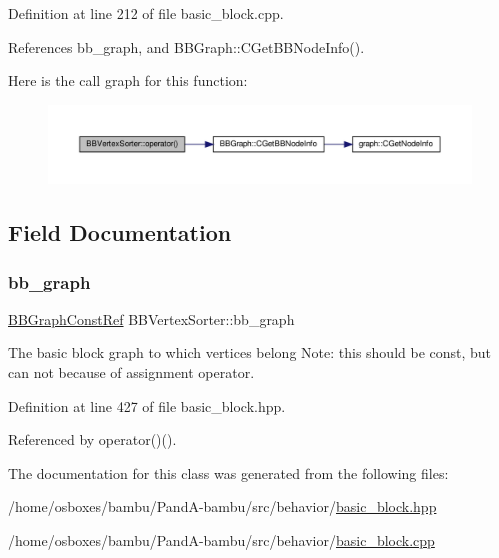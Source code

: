 Definition at line 212 of file basic\+\_\+block.\+cpp.



References bb\+\_\+graph, and B\+B\+Graph\+::\+C\+Get\+B\+B\+Node\+Info().

Here is the call graph for this function\+:
\nopagebreak
\begin{figure}[H]
\begin{center}
\leavevmode
\includegraphics[width=350pt]{d8/d74/classBBVertexSorter_a0943b78b2e713d833b00a78e20703588_cgraph}
\end{center}
\end{figure}


\subsection{Field Documentation}
\mbox{\label{classBBVertexSorter_a56dc2b2e2e26f2c91300b9c985533b23}} 
\subsubsection{\texorpdfstring{bb\+\_\+graph}{bb\_graph}}
{\footnotesize\ttfamily \hyperlink{basic__block_8hpp_ab66bdbde3a29e41d079d8a320af9c921}{B\+B\+Graph\+Const\+Ref} B\+B\+Vertex\+Sorter\+::bb\+\_\+graph\hspace{0.3cm}{\ttfamily [private]}}



The basic block graph to which vertices belong Note\+: this should be const, but can not because of assignment operator. 



Definition at line 427 of file basic\+\_\+block.\+hpp.



Referenced by operator()().



The documentation for this class was generated from the following files\+:\begin{DoxyCompactItemize}
\item 
/home/osboxes/bambu/\+Pand\+A-\/bambu/src/behavior/\hyperlink{basic__block_8hpp}{basic\+\_\+block.\+hpp}\item 
/home/osboxes/bambu/\+Pand\+A-\/bambu/src/behavior/\hyperlink{basic__block_8cpp}{basic\+\_\+block.\+cpp}\end{DoxyCompactItemize}
